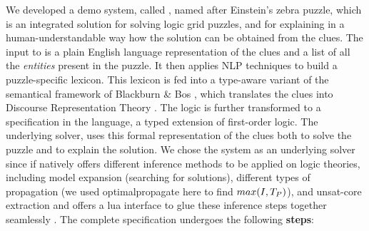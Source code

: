 % 
We developed a demo system, called \ourtool, named after Einstein's zebra puzzle, which is an integrated solution for solving logic grid puzzles, and for explaining in a human-understandable way how the solution can be obtained from the clues. 
The input to \ourtool is a plain English language representation of the clues and a list of all the \textit{entities} present in the puzzle. It then applies NLP techniques to build a puzzle-specific lexicon. This lexicon is fed into a type-aware variant of the semantical framework of Blackburn \& Bos \cite{Blackburn2005,Blackburn2006}, which translates the clues into Discourse Representation Theory \cite{DRT}. The logic is further transformed to a specification in the \idp language, a typed extension of first-order logic. 
% 
The underlying solver, \idp\cite{IDP} uses this formal representation of the clues both to solve the puzzle and to explain the solution. 
We chose the \idp system as an underlying solver since if natively offers different inference methods to be applied on logic theories, including model expansion (searching for solutions), different types of propagation (we used optimalpropagate here to find $max(I,T_P)$), and unsat-core extraction and offers a lua interface to glue these inference steps together seamlessly \cite{IDP}. 
The complete specification undergoes the following \textbf{steps}:
